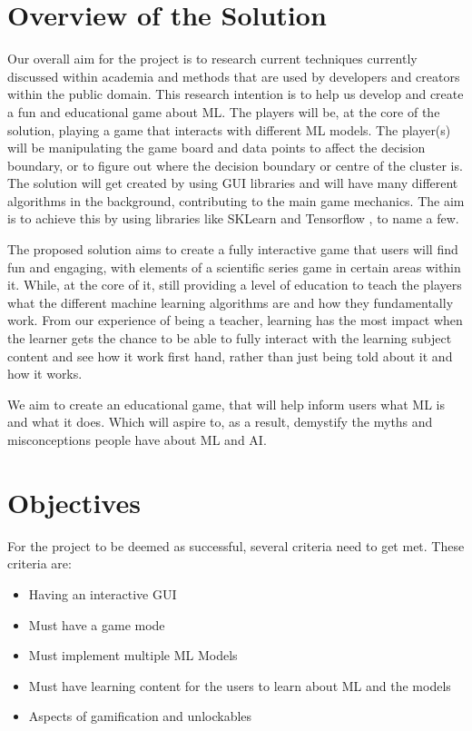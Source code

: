 	\section{Overview of the Solution}
		\label{sec:overview_of_solution}
		Our overall aim for the project is to research current techniques currently discussed within academia and methods that are used by developers and creators within the public domain. This research intention is to help us develop and create a fun and educational game about ML. The players will be, at the core of the solution, playing a game that interacts with different ML models. The player(s) will be manipulating the game board and data points to affect the decision boundary, or to figure out where the decision boundary or centre of the cluster is. The solution will get created by using  GUI libraries and will have many different algorithms in the background, contributing to the main game mechanics. The aim is to achieve this by using libraries like SKLearn \cite{sklearn_api} and Tensorflow \cite{tensorflow2015-whitepaper}, to name a few.
		
		The proposed solution aims to create a fully interactive game that users will find fun and engaging, with elements of a scientific series game in certain areas within it. While, at the core of it, still providing a level of education to teach the players what the different machine learning algorithms are and how they fundamentally work. From our experience of being a teacher, learning has the most impact when the learner gets the chance to be able to fully interact with the learning subject content and see how it work first hand, rather than just being told about it and how it works. 
		
		We aim to create an educational game, that will help inform users what ML is and what it does. Which will aspire to, as a result, demystify the myths and misconceptions people have about ML and AI.
		
	
	\section{Objectives}
	
	For the project to be deemed as successful, several criteria need to get met. These criteria are:
	
	\begin{itemize}
		\item Having an interactive GUI
		\item Must have a game mode
		\item Must implement multiple ML Models
		\item Must have learning content for the users to learn about ML and the models
		\item Aspects of gamification and unlockables
	\end{itemize}
	

